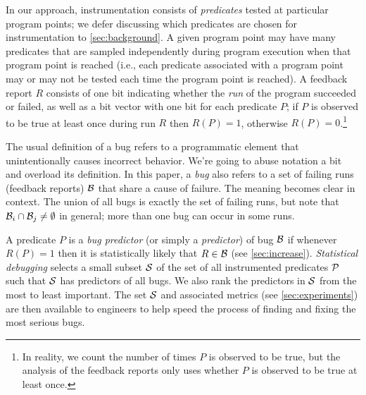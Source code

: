 \documentclass[draft]{sig-alternate}
\newcommand{\issue}[2][]{}
\begin{document}
In our approach, instrumentation consists of {\em predicates} tested
at particular program points; we defer discussing which predicates are
chosen for instrumentation to \autoref{sec:background}.  A given
program point may have many predicates that are sampled independently
during program execution when that program point is reached (i.e.,
each predicate associated with a program point may or may not be
tested each time the program point is reached).  A feedback report $R$
consists of one bit indicating whether the {\em run} of the program
succeeded or failed, as well as a bit vector with one bit for each
predicate $P$; if $P$ is observed to be true at least once during run
$R$ then $R(P) = 1$, otherwise $R(P) = 0$.\footnote{In reality, we count
the number of times $P$ is observed to be true, but the analysis of
the feedback reports only uses whether $P$ is observed to be true at
least once.}

\issue[Alice]{Comment about notation: the f(x) usually denotes some
  kind of function, do we want to treat R (a run) as a function?  I'd
  much prefer the subscript or superscript notation, which usually
  refers to an element of a vector.  How about R_P instead of R(P)?
  [I didn't make this change in the text]}
    
\issue{modified by Alice}

The usual definition of a bug refers to a programmatic element that 
unintentionally causes incorrect behavior.  We're going to abuse notation a
bit and overload its definition.  In this paper, a {\em bug} also refers to
a set of failing runs (feedback reports) ${\cal B}$
that share a cause of failure.  The meaning becomes clear in context.  The 
union of all bugs is exactly the
set of failing runs, but note that ${\cal B}_i \cap {\cal B}_j \neq
\emptyset$ in general; more than one bug can occur in some runs.

\issue[Alice]{The definition of "bug" overloads the usual definition
  of "something that causes incorrect behavior."  I understand that
  this makes the super-bug and sub-bug terminology easier to justify
  (weren't we going to use some other names for these?).  But if we're
  going to veer from the usual definition, then at least we should
  make this clear.  [text modified]}

A predicate $P$ is a {\em bug predictor} (or simply a {\em predictor})
of bug ${\cal B}$ if whenever $R(P) = 1$ then it is statistically
likely that $R \in {\cal B}$ (see \autoref{sec:increase}).  {\em
Statistical debugging} selects a small subset ${\cal S}$ of the set of
all instrumented predicates ${\cal P}$ such that ${\cal S}$ has
predictors of all bugs.  We also rank the predictors in ${\cal S}$
from the most to least important.  The set ${\cal S}$ and associated
metrics (see \autoref{sec:experiments}) are then available to
engineers to help speed the process of finding and fixing the most
serious bugs.
\end{document}
